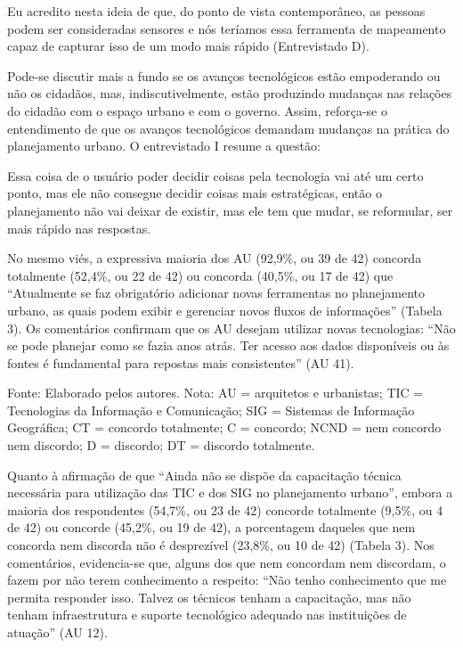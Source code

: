 \documentclass{article}
\begin{document}
Eu acredito nesta ideia de que, do ponto de vista contemporâneo, as pessoas
podem ser consideradas sensores e nós teríamos essa ferramenta de mapeamento
capaz de capturar isso de um modo mais rápido (Entrevistado
D).

Pode-se discutir mais a fundo se os avanços tecnológicos estão empoderando ou
não
os cidadãos, mas, indiscutivelmente, estão produzindo mudanças nas relações do
cidadão com o espaço urbano e com o governo. Assim, reforça-se o entendimento de
que os avanços tecnológicos demandam mudanças na prática do planejamento urbano.
O entrevistado I resume a questão:

Essa coisa de o usuário poder decidir coisas pela tecnologia vai até um certo
ponto, mas ele não consegue decidir coisas mais estratégicas, então o
planejamento não vai deixar de existir, mas ele tem que mudar, se
reformular, ser mais rápido nas respostas.

No mesmo viés, a expressiva maioria dos AU (92,9\%, ou 39 de 42) concorda
totalmente (52,4\%, ou 22 de 42) ou concorda (40,5\%, ou 17 de 42) que
“Atualmente se faz obrigatório adicionar novas ferramentas no
planejamento urbano, as quais podem exibir e gerenciar novos fluxos de
informações” (Tabela 3). Os
comentários confirmam que os AU desejam utilizar novas tecnologias: “Não
se pode planejar como se fazia anos atrás. Ter acesso aos dados disponíveis
ou às fontes é fundamental para repostas mais consistentes” (AU
41).

Fonte: Elaborado pelos autores. Nota: AU = arquitetos e urbanistas;
TIC = Tecnologias da Informação e Comunicação; SIG = Sistemas de
Informação Geográfica; CT = concordo totalmente; C = concordo; NCND
= nem concordo nem discordo; D = discordo; DT = discordo
totalmente.

Quanto à afirmação de que “Ainda não se dispõe da capacitação técnica
necessária para utilização das TIC e dos SIG no planejamento
urbano”, embora a maioria dos respondentes (54,7\%, ou 23 de 42)
concorde totalmente (9,5\%, ou 4 de 42) ou concorde (45,2\%, ou 19 de 42), a
porcentagem daqueles que nem concorda nem discorda não é desprezível (23,8\%, ou
10 de 42) (Tabela 3). Nos comentários,
evidencia-se que, alguns dos que nem concordam nem discordam, o fazem por não
terem conhecimento a respeito: “Não tenho conhecimento que me permita
responder isso. Talvez os técnicos tenham a capacitação, mas não tenham
infraestrutura e suporte tecnológico adequado nas instituições de
atuação” (AU 12).
\end{document}
